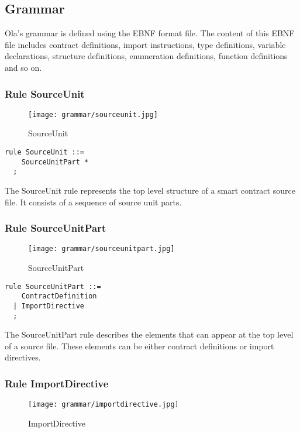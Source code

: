 \subsection{Grammar}\label{section: grammar}

Ola's grammar is defined using the EBNF format file. The content of this EBNF file includes contract definitions, import instructions, type definitions, variable declarations, structure definitions, enumeration definitions, function definitions and so on.

\subsubsection*{Rule SourceUnit}

\begin{figure}[!ht]
\centering
\texttt{[image: grammar/sourceunit.jpg]}
\caption{SourceUnit}
\end{figure}

\begin{lstlisting}
rule SourceUnit ::=
    SourceUnitPart *  
  ;
\end{lstlisting}

The SourceUnit rule represents the top level structure of a smart contract source file. It consists of a sequence of source unit parts.

\subsubsection*{Rule SourceUnitPart}

\begin{figure}[!ht]
\centering
\texttt{[image: grammar/sourceunitpart.jpg]}
\caption{SourceUnitPart}
\end{figure}

\begin{lstlisting}
rule SourceUnitPart ::=
    ContractDefinition 
  | ImportDirective 
  ;
\end{lstlisting}

The SourceUnitPart rule describes the elements that can appear at the top level of a source file. These elements can be either contract definitions or import directives.

\subsubsection*{Rule ImportDirective}

\begin{figure}[!ht]
\centering
\texttt{[image: grammar/importdirective.jpg]}
\caption{ImportDirective}
\end{figure}

